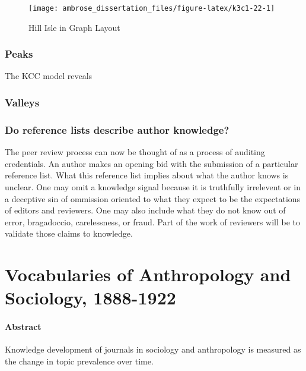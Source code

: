 \documentclass[]{book}
\theoremstyle{definition}
\theoremstyle{definition}
\theoremstyle{definition}
\theoremstyle{remark}
\begin{document}
\begin{figure}

{\centering \texttt{[image: ambrose\_dissertation\_files/figure-latex/k3c1-22-1]} 

}

\caption{Hill Isle in Graph Layout}\label{fig:k3c1-22}
\end{figure}

\hypertarget{peaks}{%
\subsection{Peaks}\label{peaks}}

The KCC model reveals

\hypertarget{valleys}{%
\subsection{Valleys}\label{valleys}}

\hypertarget{do-reference-lists-describe-author-knowledge}{%
\subsection{Do reference lists describe author
knowledge?}\label{do-reference-lists-describe-author-knowledge}}

The peer review process can now be thought of as a process of auditing
credentials. An author makes an opening bid with the submission of a
particular reference list. What this reference list implies about what
the author knows is unclear. One may omit a knowledge signal because it
is truthfully irrelevent or in a deceptive sin of ommission oriented to
what they expect to be the expectations of editors and reviewers. One
may also include what they do not know out of error, bragadoccio,
carelessness, or fraud. Part of the work of reviewers will be to
validate those claims to knowledge.

\hypertarget{voc}{%
\chapter{Vocabularies of Anthropology and Sociology,
1888-1922}\label{voc}}

\hypertarget{abstract-3}{%
\subsubsection*{Abstract}\label{abstract-3}}


Knowledge development of journals in sociology and
anthropology is measured as the change in topic prevalence over time.
\end{document}
